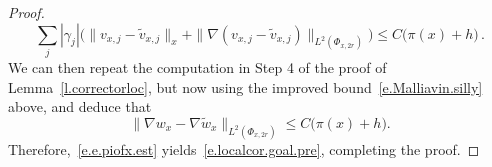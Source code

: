 \documentclass[11pt]{article} %
\numberwithin{equation}{section}
\theoremstyle{definition}
\let\originalleft\left
\let\originalright\right
\renewcommand{\left}{\mathopen{}\mathclose\bgroup\originalleft}
\renewcommand{\right}{\aftergroup\egroup\originalright}
\renewcommand*{\tilde}{\widetilde}
\newcommand{\A}{\mathcal{A}}
\begin{document}
\begin{proof}
\begin{equation}
\sum_{j} | \gamma_j | \bigl( \| v_{x,j} - \tilde v_{x,j} \|_x  +  \| \nabla (  v_{x,j} - \tilde v_{x,j})   \|_{L^2(\Phi_{x,2r})}   \bigr)
\leq 
C \bigl( \pi(x) + h \bigr)
\,.
\end{equation}
We can then repeat the computation in Step 4 of the proof of  Lemma~\ref{l.correctorloc}, but now using the improved bound~\eqref{e.Malliavin.silly} above, and deduce that 
\begin{equation*}  
\big\| \nabla w_x - \nabla \tilde w_x \big\|_{L^2(\Phi_{x,2r})} 
\leq 
C  \bigl( \pi(x) + h\bigr).
\end{equation*}
Therefore,~\eqref{e.e.piofx.est} yields~\eqref{e.localcor.goal.pre}, completing the proof. 
\end{proof}


%
%
\end{document}
